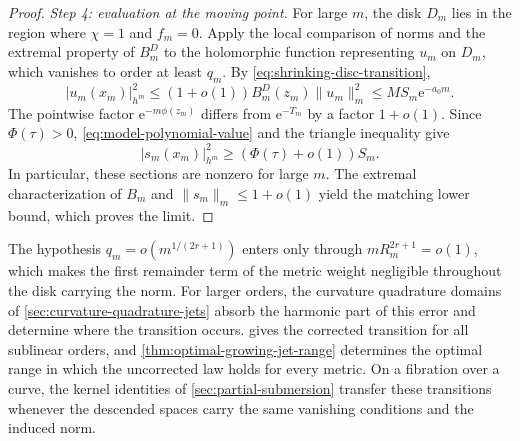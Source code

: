 \begin{proof}
\emph{Step 4: evaluation at the moving point.}
For large $m$, the disk $D_m$ lies in the region where $\chi=1$ and $f_m=0$. Apply the local comparison of norms and the extremal property of $B_m^D$ to the holomorphic function representing $u_m$ on $D_m$, which vanishes to order at least $q_m$. By \eqref{eq:shrinking-disc-transition},
\[
 |u_m(x_m)|_{h^m}^2
 \leq(1+o(1))B_m^D(z_m)\|u_m\|_m^2
 \leq M S_m\mathrm{e}^{-a_0m}.
\]
The pointwise factor $\mathrm{e}^{-m\phi(z_m)}$ differs from $\mathrm{e}^{-T_m}$ by a factor $1+o(1)$. Since $\Phi(\tau)>0$, \eqref{eq:model-polynomial-value} and the triangle inequality give
\[
 |s_m(x_m)|_{h^m}^2\geq(\Phi(\tau)+o(1))S_m.
\]
In particular, these sections are nonzero for large $m$. The extremal characterization of $B_m$ and $\|s_m\|_m\leq1+o(1)$ yield the matching lower bound, which proves the limit.
\end{proof}

The hypothesis $q_m=o(m^{1/(2r+1)})$ enters only through $mR_m^{2r+1}=o(1)$, which makes the first remainder term of the metric weight negligible throughout the disk carrying the norm. For larger orders, the curvature quadrature domains of \cref{sec:curvature-quadrature-jets} absorb the harmonic part of this error and determine where the transition occurs.  gives the corrected transition for all sublinear orders, and \cref{thm:optimal-growing-jet-range} determines the optimal range in which the uncorrected law holds for every metric. On a fibration over a curve, the kernel identities of \cref{sec:partial-submersion} transfer these transitions whenever the descended spaces carry the same vanishing conditions and the induced norm.




